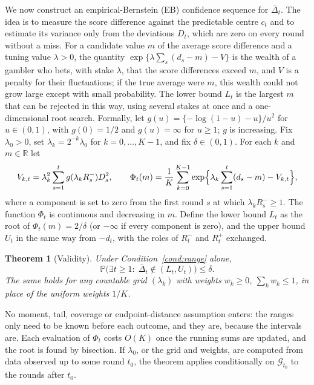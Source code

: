 \documentclass[11pt]{article}
\newtheorem{theorem}{Theorem}
\theoremstyle{remark}
\theoremstyle{definition}
\renewcommand{\Pr}{\mathbb{P}}
\newcommand{\G}{\mathcal{G}}
\newcommand{\Dbar}{\bar\Delta}
\begin{document}
We now construct an empirical-Bernstein (EB) confidence sequence for
$\Dbar_t$. The idea is to measure the score difference against the predictable centre
$c_t$ and to estimate its variance only from the deviations $D_t$, which
are zero on every round without a miss. For a candidate value $m$ of the
average score difference and a tuning value $\lambda>0$, the quantity
$\exp\{\lambda\sum_s(d_s-m)-V\}$ is the wealth of a gambler who bets, with
stake $\lambda$, that the score differences exceed $m$, and $V$ is a
penalty for their fluctuations; if the true average were $m$, this wealth
could not grow large except with small probability. The lower bound $L_t$
is the largest $m$ that can be rejected in this way, using several stakes
at once and a one-dimensional root search. Formally, let
$g(u)=\{-\log(1-u)-u\}/u^2$ for $u\in(0,1)$, with $g(0)=1/2$ and
$g(u)=\infty$ for $u\ge1$; $g$ is increasing. Fix $\lambda_0>0$, set $\lambda_k=2^{-k}\lambda_0$ for
$k=0,\ldots,K-1$, and fix $\delta\in(0,1)$. For each $k$ and $m\in\mathbb R$
let
\[
 V_{k,t}=\lambda_k^2\sum_{s=1}^tg(\lambda_kR^-_s)D_s^2,\qquad
 \Phi_t(m)=\frac1K\sum_{k=0}^{K-1}
 \exp\Bigl\{\lambda_k\sum_{s=1}^t(d_s-m)-V_{k,t}\Bigr\},
\]
where a component is set to zero from the first round $s$ at which
$\lambda_kR^-_s\ge1$. The function
$\Phi_t$ is continuous and decreasing in $m$. Define the lower bound $L_t$ as
the root of $\Phi_t(m)=2/\delta$ (or $-\infty$ if every component is zero),
and the upper bound $U_t$ in the same way from $-d_t$, with the roles of
$R^-_t$ and $R^+_t$ exchanged.

\begin{theorem}[Validity]
\label{thm:valid}
Under Condition~\ref{cond:range} alone,
\[
 \Pr\bigl(\exists t\ge1:\;\Dbar_t\notin(L_t,U_t)\bigr)\le\delta .
\]
The same holds for any countable grid $(\lambda_k)$ with weights $w_k\ge0$,
$\sum_kw_k\le1$, in place of the uniform weights $1/K$.
\end{theorem}

No moment, tail, coverage or endpoint-distance assumption enters: the
ranges only need to be known before each outcome, and they are, because the
intervals are. Each evaluation of $\Phi_t$ costs $O(K)$ once the running sums are
updated, and the root is found by bisection. If $\lambda_0$, or the grid
and weights, are computed from data observed up to some round $t_0$, the
theorem applies conditionally on $\G_{t_0}$ to the rounds after $t_0$.
\end{document}
